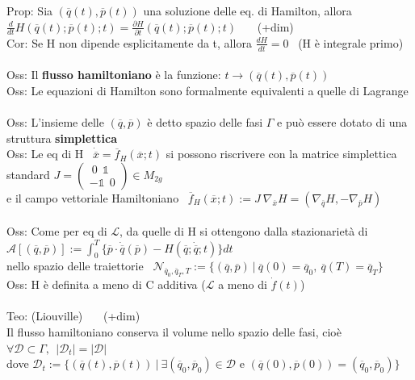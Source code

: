 \documentclass{article}
\theoremstyle{unnumbered}
\theoremstyle{unnumbered1}
\begin{document}
%
Prop: Sia $(\overline{q}(t),\overline{p}(t))$ una soluzione delle eq.\! di Hamilton, allora $\frac{d}{dt}H(\overline{q}(t);\overline{p}(t);t)=\frac{\partial H}{\partial t}(\overline{q}(t);\overline{p}(t);t)$ \ \ \ (+dim)\\
%
Cor: Se H non dipende esplicitamente da t, allora $\frac{dH}{dt}=0$ \ (H è integrale primo) \\ \\
%
%
%
Oss: Il \textbf{flusso hamiltoniano} è la funzione: $t\rightarrow (\overline{q}(t),\overline{p}(t))$\\
%
Oss: Le equazioni di Hamilton sono formalmente equivalenti a quelle di Lagrange \\ \\
%
%
%
Oss: L'insieme delle $(\overline{q},\overline{p})$ è detto spazio delle fasi $\Gamma$ e può essere dotato di una struttura \textbf{simplettica}\\
%
Oss: Le eq di H \ $\dot{\overline{x}}=\overline{f}_H (\overline{x};t)$ si possono riscrivere con la matrice simplettica standard $J=\begin{pmatrix}
    \ 0 \ \ \mathds{1} \\
    -\mathds{1} \ \ 0
\end{pmatrix} \in M_{2g}$\\
\phantom{Oss: }e il campo vettoriale Hamiltoniano \ $\overline{f}_H (\overline{x};t) := J \ \nabla_{\overline{x}}H =(\nabla_{\overline{q}}H , -\nabla_{\overline{p}}H) $ \\ \\
%
%
%
Oss: Come per eq di $\mathcal{L}$, da quelle di H si ottengono dalla stazionarietà di \ $\mathcal{A}[(\overline{q},\overline{p})]:=\int_0^T\{\overline{p}\cdot\dot{\overline{q}}(\overline{p}) - H(\overline{q};\dot{\overline{q}};t)\}dt$ \\
\phantom{Oss: }nello spazio delle traiettorie \ $\mathcal{N}_{\overline{q}_0,\overline{q}_T,T}:=\{ (\overline{q},\overline{p}) \ | \ \overline{q}(0)=\overline{q}_0 , \ \overline{q}(T)=\overline{q}_T \}$ \\
Oss: H è definita a meno di C additiva ($\mathcal{L}$ a meno di $\dot{f}(t)$) \\ \\
%
%
%
Teo: (Liouville) \ \ \ (+dim)\\
Il flusso hamiltoniano conserva il volume nello spazio delle fasi, cioè $\forall \mathcal{D}\subset\Gamma, \ \ |\mathcal{D}_t|=|\mathcal{D}|$ \\
dove $\mathcal{D}_t:=\{ (\overline{q}(t),\overline{p}(t)) \ | \ \exists (\overline{q}_0,\overline{p}_0)\in \mathcal{D} \text{ e } (\overline{q}(0),\overline{p}(0))=(\overline{q}_0,\overline{p}_0)  \}$ \\
\end{document}
